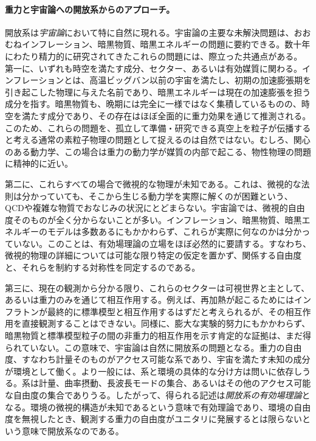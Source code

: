 \documentclass[a4paper,11pt,oneside]{article}
\theoremstyle{definition}
\numberwithin{equation}{section}
\begin{document}
\paragraph{重力と宇宙論への開放系からのアプローチ。} 開放系は\textit{宇宙論}において特に自然に現れる。宇宙論の主要な未解決問題は、おおむねインフレーション、暗黒物質、暗黒エネルギーの問題に要約できる。数十年にわたり精力的に研究されてきたこれらの問題には、際立った共通点がある。
第一に、いずれも時空を満たす成分、セクター、あるいは有効媒質に関わる。インフレーションとは、高温ビッグバン以前の宇宙を満たし、初期の加速膨張期を引き起こした物理に与えた名前であり、暗黒エネルギーは現在の加速膨張を担う成分を指す。暗黒物質も、晩期には完全に一様ではなく集積しているものの、時空を満たす成分であり、その存在はほぼ全面的に重力効果を通じて推測される。このため、これらの問題を、孤立して準備・研究できる真空上を粒子が伝播すると考える通常の素粒子物理の問題として捉えるのは自然ではない。むしろ、関心のある動力学、この場合は重力の動力学が媒質の内部で起こる、物性物理の問題に精神的に近い。



第二に、これらすべての場合で微視的な物理が未知である。これは、微視的な法則は分かっていても、そこから生じる動力学を実際に解くのが困難という、QCDや複雑な物質でおなじみの状況にとどまらない。宇宙論では、微視的自由度そのものが全く分からないことが多い。インフレーション、暗黒物質、暗黒エネルギーのモデルは多数あるにもかかわらず、これらが実際に何なのかは分かっていない。このことは、有効場理論の立場をほぼ必然的に要請する。すなわち、微視的物理の詳細については可能な限り特定の仮定を置かず、関係する自由度と、それらを制約する対称性を同定するのである。



第三に、現在の観測から分かる限り、これらのセクターは可視世界と主として、あるいは重力のみを通じて相互作用する。例えば、再加熱が起こるためにはインフラトンが最終的に標準模型と相互作用するはずだと考えられるが、その相互作用を直接観測することはできない。同様に、膨大な実験的努力にもかかわらず、暗黒物質と標準模型粒子の間の非重力的相互作用を示す肯定的な証拠は、まだ得られていない。この意味で、宇宙論は自然に開放系の問題となる。重力の自由度、すなわち計量そのものがアクセス可能な系であり、宇宙を満たす未知の成分が環境として働く。より一般には、系と環境の具体的な分け方は問いに依存しうる。系は計量、曲率摂動、長波長モードの集合、あるいはその他のアクセス可能な自由度の集合でありうる。したがって、得られる記述は\textit{開放系の有効場理論}となる。環境の微視的構造が未知であるという意味で有効理論であり、環境の自由度を無視したとき、観測する重力の自由度がユニタリに発展するとは限らないという意味で開放系なのである。
\end{document}
